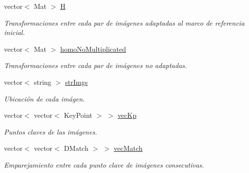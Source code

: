 \begin{DoxyCompactItemize}
vector$<$ Mat $>$ \mbox{\hyperlink{classuav_1_1Stitcher_a1fad5b1dfd31fa5a9ec63b41b6e6eda1}{H}}
\begin{DoxyCompactList}\small\item\em Transformaciones entre cada par de imágenes adaptadas al marco de referencia inicial. \end{DoxyCompactList}\item 
\mbox{\label{classuav_1_1Stitcher_a1ff9477028582e3b935101bafb64cde7}} 
vector$<$ Mat $>$ \mbox{\hyperlink{classuav_1_1Stitcher_a1ff9477028582e3b935101bafb64cde7}{homo\+No\+Multiplicated}}
\begin{DoxyCompactList}\small\item\em Transformaciones entre cada par de imágenes no adaptadas. \end{DoxyCompactList}\item 
\mbox{\label{classuav_1_1Stitcher_a1217b2cb8a67e8928b0073b6478aa594}} 
vector$<$ string $>$ \mbox{\hyperlink{classuav_1_1Stitcher_a1217b2cb8a67e8928b0073b6478aa594}{str\+Imgs}}
\begin{DoxyCompactList}\small\item\em Ubicación de cada imágen. \end{DoxyCompactList}\item 
\mbox{\label{classuav_1_1Stitcher_af1e3706aa47771911eb5429ade12c287}} 
vector$<$ vector$<$ Key\+Point $>$ $>$ \mbox{\hyperlink{classuav_1_1Stitcher_af1e3706aa47771911eb5429ade12c287}{vec\+Kp}}
\begin{DoxyCompactList}\small\item\em Puntos claves de las imágenes. \end{DoxyCompactList}\item 
\mbox{\label{classuav_1_1Stitcher_a31fb6a699efa47ae64fe109201ef216c}} 
vector$<$ vector$<$ D\+Match $>$ $>$ \mbox{\hyperlink{classuav_1_1Stitcher_a31fb6a699efa47ae64fe109201ef216c}{vec\+Match}}
\begin{DoxyCompactList}\small\item\em Emparejamiento entre cada punto clave de imágenes consecutivas. \end{DoxyCompactList}\item 
\mbox{\label{classuav_1_1Stitcher_a3aecc00facecd4f6952594b76cf4ea52}} 

\end{DoxyCompactItemize}
